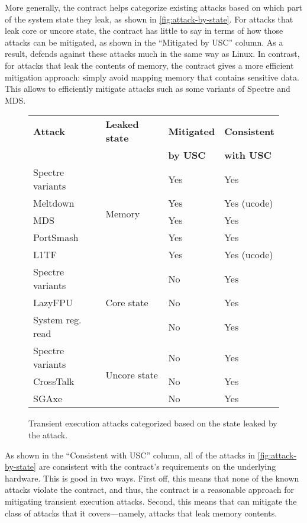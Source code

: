 More generally, the contract helps categorize existing attacks
based on which part of the system state they leak, as shown in
\autoref{fig:attack-by-state}.  For attacks that leak core or uncore
state, the contract has little to say in terms of how those attacks
can be mitigated, as shown in the ``Mitigated by USC'' column.  As a
result, \sys defends against these attacks much in the same way as Linux.
In contrast, for attacks that leak the contents of memory, the contract
gives a more efficient mitigation approach: simply avoid mapping memory
that contains sensitive data.  This allows \sys to efficiently mitigate
attacks such as some variants of Spectre and MDS.

\begin{figure}
\small
\centering
\begin{tabular}{@{}llll@{}}
\textbf{Attack} & \textbf{Leaked state} & \textbf{Mitigated} & \textbf{Consistent} \\
&& \textbf{by USC} & \textbf{with USC} \\
\midrule

Spectre variants & \multirow{5}{0.75in}{Memory} & Yes & Yes\\
Meltdown & & Yes & Yes (ucode)\\
MDS & & Yes & Yes\\
PortSmash & & Yes & Yes\\
L1TF & & Yes & Yes (ucode)\\

\midrule

Spectre variants & \multirow{3}{0.75in}{Core state} & No & Yes \\
LazyFPU & & No & Yes \\
System reg. read & & No & Yes \\

\midrule

Spectre variants & \multirow{3}{0.75in}{Uncore state} & No & Yes \\
CrossTalk & & No & Yes \\
SGAxe & & No & Yes \\

\end{tabular}
\caption{Transient execution attacks categorized based on the
  state leaked by the attack.}
\label{fig:attack-by-state}
\end{figure}

As shown in the ``Consistent with USC'' column, all of the attacks
in \autoref{fig:attack-by-state} are consistent with the contract's
requirements on the underlying hardware.  This is good in two ways.
First off, this means that none of the known attacks violate the contract,
and thus, the contract is a reasonable approach for mitigating transient
execution attacks.  Second, this means that \contract can mitigate
the class of attacks that it covers---namely, attacks that leak memory
contents.

